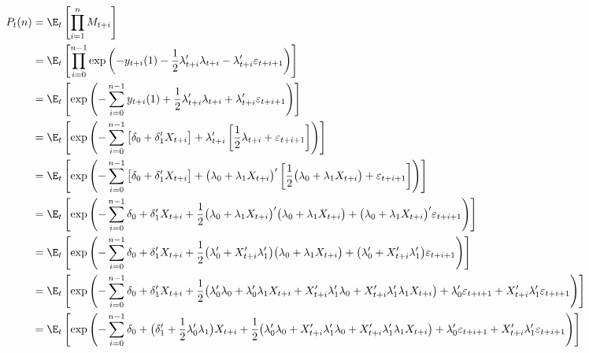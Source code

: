 \documentclass[12pt]{article}
\theoremstyle{plain}
\theoremstyle{definition}
\theoremstyle{remark}
\begin{document}
\begin{align*}
  P_t(n)
  &= \E_t
  \left[
    \prod_{i=1}^n M_{t+i}
  \right]
  \\
  &= \E_t
  \left[
    \prod_{i=0}^{n-1}
    \exp\left(
    -y_{t+i}(1)
    - \frac{1}{2}\lambda_{t+i}'\lambda_{t+i}
    - \lambda_{t+i}'\varepsilon_{t+i+1}
    \right)
  \right]
  \\
  &= \E_t
  \left[
    \exp\left(
    -\sum_{i=0}^{n-1}
    y_{t+i}(1)
    + \frac{1}{2}\lambda_{t+i}'\lambda_{t+i}
    + \lambda_{t+i}'\varepsilon_{t+i+1}
    \right)
  \right]
  \\
  &= \E_t
  \left[
    \exp\left(
    -\sum_{i=0}^{n-1}
    \big[
    \delta_0 + \delta_1'X_{t+i}
    \big]
    + \lambda_{t+i}'
    \left[
    \frac{1}{2}\lambda_{t+i}
    +\varepsilon_{t+i+1}
    \right]
    \right)
  \right]
  \\
  &= \E_t
  \left[
    \exp\left(
    -\sum_{i=0}^{n-1}
    \big[
    \delta_0 + \delta_1'X_{t+i}
    \big]
    +
    \big(
    \lambda_0 + \lambda_1X_{t+i}
    \big)'
    \left[
    \frac{1}{2}
    \big(
    \lambda_0 + \lambda_1 X_{t+i}
    \big)
    +\varepsilon_{t+i+1}
    \right]
    \right)
  \right]
  \\
  &= \E_t
  \left[
    \exp\left(
    -\sum_{i=0}^{n-1}
    \delta_0 +
    \delta_1'X_{t+i}
    +
    \frac{1}{2}
    \big(
    \lambda_0 + \lambda_1X_{t+i}
    \big)'
    \big(
    \lambda_0 + \lambda_1X_{t+i}
    \big)
    +
    \big(
    \lambda_0 + \lambda_1X_{t+i}
    \big)'
    \varepsilon_{t+i+1}
    \right)
  \right]
  \\
  &= \E_t
  \left[
    \exp\left(
    -\sum_{i=0}^{n-1}
    \delta_0 +
    \delta_1'X_{t+i}
    +
    \frac{1}{2}
    \big(
    \lambda_0' + X_{t+i}'\lambda_1'
    \big)
    \big(
    \lambda_0 + \lambda_1X_{t+i}
    \big)
    +
    \big(
    \lambda_0' + X_{t+i}'\lambda_1'
    \big)
    \varepsilon_{t+i+1}
    \right)
  \right]
  \\
  &= \E_t
  \left[
    \exp\left(
    -\sum_{i=0}^{n-1}
    \delta_0 +
    \delta_1'X_{t+i}
    +
    \frac{1}{2}
    \big(
    \lambda_0'\lambda_0
    +\lambda_0'\lambda_1X_{t+i}
    + X_{t+i}'\lambda_1'\lambda_0
    + X_{t+i}'\lambda_1'\lambda_1X_{t+i}
    \big)
    +
    \lambda_0'
    \varepsilon_{t+i+1}
    + X_{t+i}'\lambda_1'
    \varepsilon_{t+i+1}
    \right)
  \right]
  \\
  &= \E_t
  \left[
    \exp\left(
    -\sum_{i=0}^{n-1}
    \delta_0 +
    \big(
    \delta_1'
    + \frac{1}{2}\lambda_0'\lambda_1
    \big)
    X_{t+i}
    +
    \frac{1}{2}
    \big(
    \lambda_0'\lambda_0
    + X_{t+i}'\lambda_1'\lambda_0
    + X_{t+i}'\lambda_1'\lambda_1X_{t+i}
    \big)
    +
    \lambda_0'
    \varepsilon_{t+i+1}
    + X_{t+i}'\lambda_1'
    \varepsilon_{t+i+1}
    \right)
  \right]
  \\
\end{align*}



\end{document}
